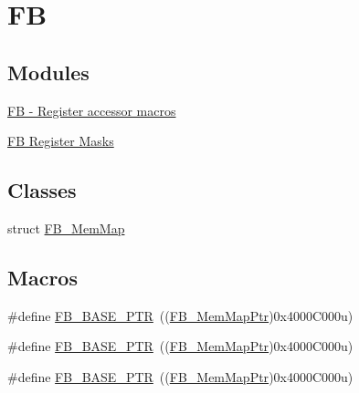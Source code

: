 \hypertarget{group___f_b___peripheral}{}\section{FB}
\label{group___f_b___peripheral}
\subsection*{Modules}
\begin{DoxyCompactItemize}
\item 
\hyperlink{group___f_b___register___accessor___macros}{F\+B -\/ Register accessor macros}
\item 
\hyperlink{group___f_b___register___masks}{F\+B Register Masks}
\end{DoxyCompactItemize}
\subsection*{Classes}
\begin{DoxyCompactItemize}
\item 
struct \hyperlink{struct_f_b___mem_map}{F\+B\+\_\+\+Mem\+Map}
\end{DoxyCompactItemize}
\subsection*{Macros}
\begin{DoxyCompactItemize}
\item 
\#define \hyperlink{group___f_b___peripheral_gace69013248279ed94480b3d6f6aa9fa6}{F\+B\+\_\+\+B\+A\+S\+E\+\_\+\+P\+TR}~((\hyperlink{group___f_b___peripheral_gaebb09d71e958c6590cf946799cb4aa11}{F\+B\+\_\+\+Mem\+Map\+Ptr})0x4000\+C000u)
\item 
\#define \hyperlink{group___f_b___peripheral_gace69013248279ed94480b3d6f6aa9fa6}{F\+B\+\_\+\+B\+A\+S\+E\+\_\+\+P\+TR}~((\hyperlink{group___f_b___peripheral_gaebb09d71e958c6590cf946799cb4aa11}{F\+B\+\_\+\+Mem\+Map\+Ptr})0x4000\+C000u)
\item 
\#define \hyperlink{group___f_b___peripheral_gace69013248279ed94480b3d6f6aa9fa6}{F\+B\+\_\+\+B\+A\+S\+E\+\_\+\+P\+TR}~((\hyperlink{group___f_b___peripheral_gaebb09d71e958c6590cf946799cb4aa11}{F\+B\+\_\+\+Mem\+Map\+Ptr})0x4000\+C000u)
\end{DoxyCompactItemize}
